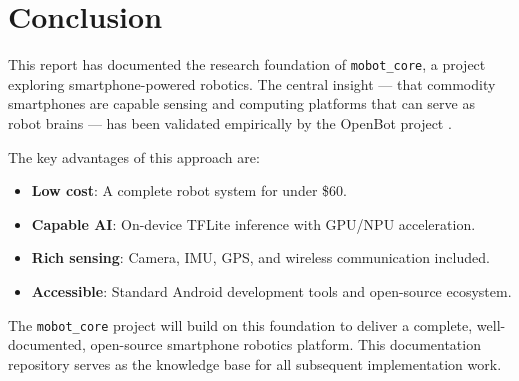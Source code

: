 \documentclass[12pt,a4paper]{article}
\begin{document}
\section{Conclusion}
\label{sec:conclusion}

This report has documented the research foundation of \texttt{mobot\_core}, a project
exploring smartphone-powered robotics. The central insight — that commodity smartphones
are capable sensing and computing platforms that can serve as robot brains — has been
validated empirically by the OpenBot project \citep{openbot2021}.

The key advantages of this approach are:
\begin{itemize}
    \item \textbf{Low cost}: A complete robot system for under \$60.
    \item \textbf{Capable AI}: On-device TFLite inference with GPU/NPU acceleration.
    \item \textbf{Rich sensing}: Camera, IMU, GPS, and wireless communication included.
    \item \textbf{Accessible}: Standard Android development tools and open-source ecosystem.
\end{itemize}

The \texttt{mobot\_core} project will build on this foundation to deliver a complete,
well-documented, open-source smartphone robotics platform. This documentation repository
serves as the knowledge base for all subsequent implementation work.



\end{document}
